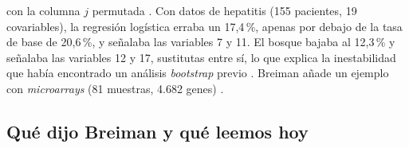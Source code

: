\documentclass[11pt,a4paper]{article}
\begin{document}
con la columna \(j\) permutada \autocites[211]{breiman2001}{breiman2001rf}. Con datos de hepatitis (155 pacientes, 19 covariables), la regresión logística erraba un 17,4\,\%, apenas por debajo de la tasa de base de 20,6\,\%, y señalaba las variables 7 y 11. El bosque bajaba al 12,3\,\% y señalaba las variables 12 y 17, sustitutas entre sí, lo que explica la inestabilidad que había encontrado un análisis \emph{bootstrap} previo \autocite[210--213]{breiman2001}. Breiman añade un ejemplo con \emph{microarrays} (81 muestras, 4.682 genes) \autocite[213]{breiman2001}.

\subsection{Qué dijo Breiman y qué leemos hoy}

\begingroup\small
\end{document}
